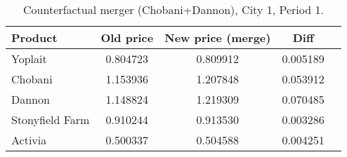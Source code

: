 \begin{table}[H]
\centering
\caption{Counterfactual merger (Chobani+Dannon), City 1, Period 1.}
\begin{tabular}{lcccc}
\toprule
Product & Old price & New price (merge) & Diff \\
\midrule
Yoplait & 0.804723 & 0.809912 & 0.005189 \\
Chobani & 1.153936 & 1.207848 & 0.053912 \\
Dannon & 1.148824 & 1.219309 & 0.070485 \\
Stonyfield Farm & 0.910244 & 0.913530 & 0.003286 \\
Activia & 0.500337 & 0.504588 & 0.004251 \\
\bottomrule
\end{tabular}
\label{tab:q16_merge_c1t1}
\end{table}
